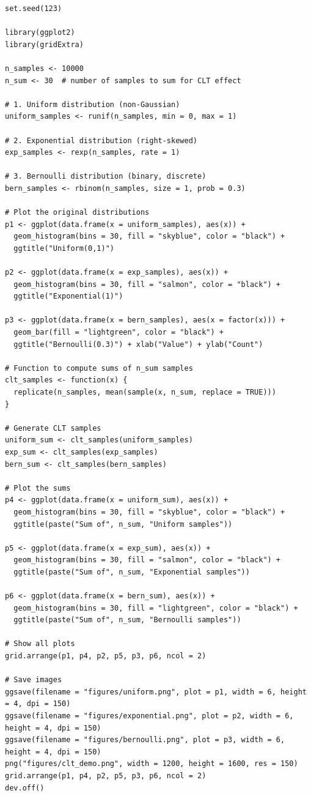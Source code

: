 \documentclass[11pt]{article}
\begin{document}
\begin{verbatim}
set.seed(123)

library(ggplot2)
library(gridExtra)

n_samples <- 10000
n_sum <- 30  # number of samples to sum for CLT effect

# 1. Uniform distribution (non-Gaussian)
uniform_samples <- runif(n_samples, min = 0, max = 1)

# 2. Exponential distribution (right-skewed)
exp_samples <- rexp(n_samples, rate = 1)

# 3. Bernoulli distribution (binary, discrete)
bern_samples <- rbinom(n_samples, size = 1, prob = 0.3)

# Plot the original distributions
p1 <- ggplot(data.frame(x = uniform_samples), aes(x)) +
  geom_histogram(bins = 30, fill = "skyblue", color = "black") +
  ggtitle("Uniform(0,1)")

p2 <- ggplot(data.frame(x = exp_samples), aes(x)) +
  geom_histogram(bins = 30, fill = "salmon", color = "black") +
  ggtitle("Exponential(1)")

p3 <- ggplot(data.frame(x = bern_samples), aes(x = factor(x))) +
  geom_bar(fill = "lightgreen", color = "black") +
  ggtitle("Bernoulli(0.3)") + xlab("Value") + ylab("Count")

# Function to compute sums of n_sum samples
clt_samples <- function(x) {
  replicate(n_samples, mean(sample(x, n_sum, replace = TRUE)))
}

# Generate CLT samples
uniform_sum <- clt_samples(uniform_samples)
exp_sum <- clt_samples(exp_samples)
bern_sum <- clt_samples(bern_samples)

# Plot the sums
p4 <- ggplot(data.frame(x = uniform_sum), aes(x)) +
  geom_histogram(bins = 30, fill = "skyblue", color = "black") +
  ggtitle(paste("Sum of", n_sum, "Uniform samples"))

p5 <- ggplot(data.frame(x = exp_sum), aes(x)) +
  geom_histogram(bins = 30, fill = "salmon", color = "black") +
  ggtitle(paste("Sum of", n_sum, "Exponential samples"))

p6 <- ggplot(data.frame(x = bern_sum), aes(x)) +
  geom_histogram(bins = 30, fill = "lightgreen", color = "black") +
  ggtitle(paste("Sum of", n_sum, "Bernoulli samples"))

# Show all plots
grid.arrange(p1, p4, p2, p5, p3, p6, ncol = 2)

# Save images
ggsave(filename = "figures/uniform.png", plot = p1, width = 6, height = 4, dpi = 150)
ggsave(filename = "figures/exponential.png", plot = p2, width = 6, height = 4, dpi = 150)
ggsave(filename = "figures/bernoulli.png", plot = p3, width = 6, height = 4, dpi = 150)
png("figures/clt_demo.png", width = 1200, height = 1600, res = 150)
grid.arrange(p1, p4, p2, p5, p3, p6, ncol = 2)
dev.off()
\end{verbatim}
\end{document}
